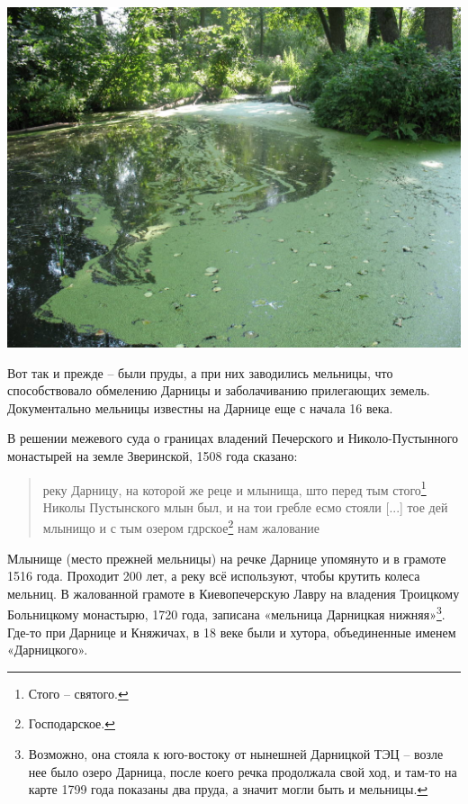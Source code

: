 \begin{center}
\includegraphics[width=\linewidth]{chast-gorodki/darn/s_darn-IMG_2751.JPG}
\end{center}
\vspace*{\fill}
\newpage

Вот так и прежде – были пруды, а при них заводились мельницы, что способствовало обмелению Дарницы и заболачиванию прилегающих земель. Документально мельницы известны на Дарнице еще с начала 16 века. 

В решении межевого суда о границах владений Печерского и Николо-Пустынного монастырей на земле Зверинской, 1508 года сказано\cite[том 4, часть 8, стр. 160]{akty02}:

\begin{quotation} 
реку Дарницу, на которой же реце и млынища, што перед тым стого\footnote{Стого – святого.} Николы Пустынского млын был, и на тои гребле есмо стояли [...] тое дей млынищо и с тым озером гдрское\footnote{Господарское.} нам жалование
\end{quotation} 

Млынище (место прежней мельницы) на речке Дарнице упомянуто и в грамоте 1516 года. Проходит 200 лет, а реку всё используют, чтобы крутить колеса мельниц. В жалованной грамоте в Киевопечерскую Лавру на владения Троицкому Больницкому монастырю, 1720 года, записана «мельница Дарницкая нижняя»\footnote{Возможно, она стояла к юго-востоку от нынешней Дарницкой ТЭЦ – возле нее было озеро Дарница, после коего речка продолжала свой ход, и там-то на карте 1799 года показаны два пруда, а значит могли быть и мельницы.}. Где-то при Дарнице и Княжичах, в 18 веке были и хутора, объединенные именем «Дарницкого».

